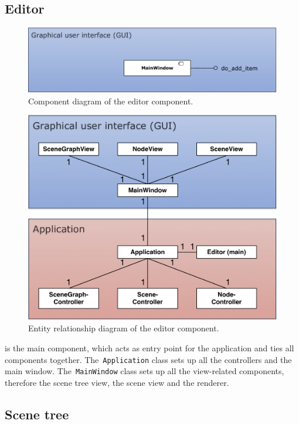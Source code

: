 \documentclass[%
    a4paper,    %
    justified,  %
    nobib,      %
    openany     %
]{tufte-book}
\makeatletter
\renewcommand{\label}[1]{\@tufte@label{##1}}%
\makeatother
\begin{document}
\newpage{}

\subsection{Editor}
\label{results:subsec:program:editor}

\begin{figure}[!htbp]
  \includegraphics[width=0.55\linewidth]{images/editor-component-diagram}
  \caption{Component diagram of the editor component.}
\label{fig:editor-component-diagram}
\end{figure}

\begin{figure}[!htbp]
  \includegraphics[width=0.75\linewidth]{images/editor-erd}
  \caption{Entity relationship diagram of the editor component.}
\label{fig:editor-erd}
\end{figure}

 is the main component, which acts as entry
point for the application and ties all components together.
The~\verb=Application= class sets up all the controllers and the main window.
The~\verb=MainWindow= class sets up all the view-related components, therefore
the scene tree view, the scene view and the renderer.

\subsection{Scene tree}
\label{results:subsec:program:scene-tree}
\end{document}
